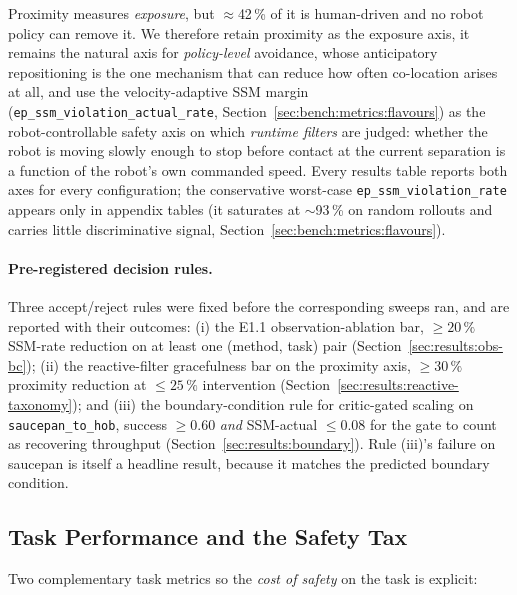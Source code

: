 \documentclass[11pt,a4paper]{report}
\newcommand{\ssm}{SSM}
\begin{document}
Proximity measures \emph{exposure}, but $\approx$42\,\% of it is
human-driven and no robot policy can remove it. We therefore retain
proximity as the exposure axis, it remains the natural axis for
\emph{policy-level} avoidance, whose anticipatory repositioning is
the one mechanism that can reduce how often co-location arises at
all, and use the velocity-adaptive \ssm{} margin
(\texttt{ep\_ssm\_violation\_actual\_rate},
Section~\ref{sec:bench:metrics:flavours}) as the robot-controllable
safety axis on which \emph{runtime filters} are judged: whether the
robot is moving slowly enough to stop before contact at the current
separation is a function of the robot's own commanded speed.
Every results table reports both axes for every configuration; the
conservative worst-case \texttt{ep\_ssm\_violation\_rate} appears
only in appendix tables (it saturates at $\sim$93\,\% on random
rollouts and carries little discriminative signal,
Section~\ref{sec:bench:metrics:flavours}).

\paragraph{Pre-registered decision rules.}
Three accept/reject rules were fixed before the corresponding sweeps
ran, and are reported with their outcomes: (i) the E1.1
observation-ablation bar, $\geq 20\,\%$ \ssm{}-rate reduction on at
least one (method, task) pair
(Section~\ref{sec:results:obs-bc}); (ii) the reactive-filter
gracefulness bar on the proximity axis, $\geq 30\,\%$ proximity
reduction at $\leq 25\,\%$ intervention
(Section~\ref{sec:results:reactive-taxonomy}); and (iii) the
boundary-condition rule for critic-gated scaling on
\texttt{saucepan\_to\_hob}, success $\geq 0.60$ \emph{and}
\ssm{}-actual $\leq 0.08$ for the gate to count as recovering
throughput (Section~\ref{sec:results:boundary}). Rule (iii)'s failure
on saucepan is itself a headline result, because it matches the
predicted boundary condition.

\subsection{Task Performance and the Safety Tax}
\label{sec:setup:metrics:task}

Two complementary task metrics so the \emph{cost of safety} on the
task is explicit:
\end{document}
